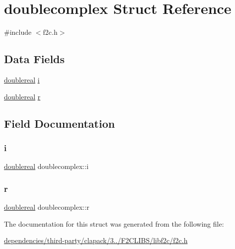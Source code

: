 \hypertarget{structdoublecomplex}{}\section{doublecomplex Struct Reference}
\label{structdoublecomplex}


{\ttfamily \#include $<$f2c.\+h$>$}

\subsection*{Data Fields}
\begin{DoxyCompactItemize}
\item 
\hyperlink{dependencies_2third-party_2clapack_23_82_81_2_f2_c_l_i_b_s_2libf2c_2f2c_8h_a1e69afaa4e6077b67397e6c36454b97a}{doublereal} \hyperlink{structdoublecomplex_a29ac0f1fc7a96e2344ef1464a80e2877}{i}
\item 
\hyperlink{dependencies_2third-party_2clapack_23_82_81_2_f2_c_l_i_b_s_2libf2c_2f2c_8h_a1e69afaa4e6077b67397e6c36454b97a}{doublereal} \hyperlink{structdoublecomplex_aa21d9095ea8af6f0530961e14e25d060}{r}
\end{DoxyCompactItemize}


\subsection{Field Documentation}
\mbox{\label{structdoublecomplex_a29ac0f1fc7a96e2344ef1464a80e2877}} 
\subsubsection{\texorpdfstring{i}{i}}
{\footnotesize\ttfamily \hyperlink{dependencies_2third-party_2clapack_23_82_81_2_f2_c_l_i_b_s_2libf2c_2f2c_8h_a1e69afaa4e6077b67397e6c36454b97a}{doublereal} doublecomplex\+::i}

\mbox{\label{structdoublecomplex_aa21d9095ea8af6f0530961e14e25d060}} 
\subsubsection{\texorpdfstring{r}{r}}
{\footnotesize\ttfamily \hyperlink{dependencies_2third-party_2clapack_23_82_81_2_f2_c_l_i_b_s_2libf2c_2f2c_8h_a1e69afaa4e6077b67397e6c36454b97a}{doublereal} doublecomplex\+::r}



The documentation for this struct was generated from the following file\+:\begin{DoxyCompactItemize}
\item 
\hyperlink{dependencies_2third-party_2clapack_23_82_81_2_f2_c_l_i_b_s_2libf2c_2f2c_8h}{dependencies/third-\/party/clapack/3../\+F2\+C\+L\+I\+B\+S/libf2c/f2c.\+h}\end{DoxyCompactItemize}
